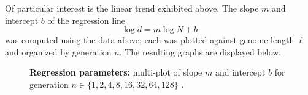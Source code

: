   Of particular interest is the linear trend exhibited above.  The
  slope $m$ and intercept $b$ of the regression line
  \begin{equation} \label{regresion}
  \log d = m \log N + b
  \end{equation}
was computed using the data above; each was plotted against genome
length $\ell$ and organized by generation $n$. The resulting
graphs are displayed below.

\begin{figure}[htp]
\begin{center}
\hspace{5pt}
\caption[\textbf{Regression parameters}]{\textbf{Regression parameters:} multi-plot of slope $m$ and intercept $b$ for generation  $n \in \{1,  2,  4,  8,  16,  32,  64,  128\}$ .}
\label{regression-parameters}
\end{center}
\end{figure}

